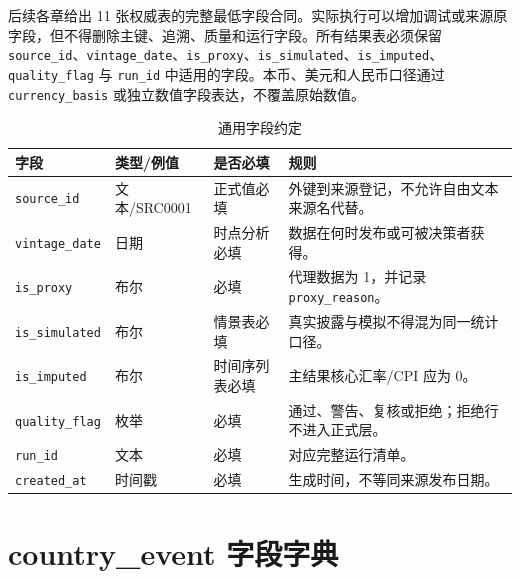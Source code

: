 \documentclass[UTF8,fontset=windows,12pt,openany]{ctexbook}
\newcommand{\Field}[1]{{\small\nolinkurl{#1}}}
\begin{document}
后续各章给出 11 张权威表的完整最低字段合同。实际执行可以增加调试或来源原字段，但不得删除主键、追溯、质量和运行字段。所有结果表必须保留 \Field{source_id}、\Field{vintage_date}、\Field{is_proxy}、\Field{is_simulated}、\Field{is_imputed}、\Field{quality_flag} 与 \Field{run_id} 中适用的字段。本币、美元和人民币口径通过 \Field{currency_basis} 或独立数值字段表达，不覆盖原始数值。

\begin{longtable}{p{3.0cm}p{3.1cm}p{3.0cm}p{4.4cm}}
\caption{通用字段约定}\label{tab:common-fields}\\
\toprule
\textbf{字段} & \textbf{类型/例值} & \textbf{是否必填} & \textbf{规则}\\
\midrule
\Field{source_id} & 文本/SRC0001 & 正式值必填 & 外键到来源登记，不允许自由文本来源名代替。\\
\Field{vintage_date} & 日期 & 时点分析必填 & 数据在何时发布或可被决策者获得。\\
\Field{is_proxy} & 布尔 & 必填 & 代理数据为 1，并记录 \Field{proxy_reason}。\\
\Field{is_simulated} & 布尔 & 情景表必填 & 真实披露与模拟不得混为同一统计口径。\\
\Field{is_imputed} & 布尔 & 时间序列表必填 & 主结果核心汇率/CPI 应为 0。\\
\Field{quality_flag} & 枚举 & 必填 & 通过、警告、复核或拒绝；拒绝行不进入正式层。\\
\Field{run_id} & 文本 & 必填 & 对应完整运行清单。\\
\Field{created_at} & 时间戳 & 必填 & 生成时间，不等同来源发布日期。\\
\bottomrule
\end{longtable}

\chapter{country\_event 字段字典}
\end{document}

